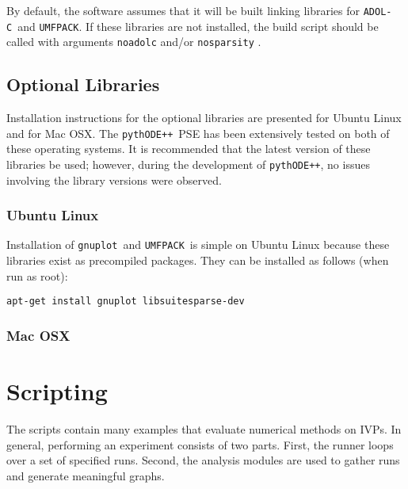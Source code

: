 \documentclass[11pt]{article}
\newcommand{\pypp}{\texttt{pythODE++}}
\newcommand{\adolc}{\texttt{ADOL-C}}
\newcommand{\umfpack}{\texttt{UMFPACK}}
\newcommand{\gnuplot}{\texttt{gnuplot}}
\begin{document}
By default, the software assumes that it will be built linking
libraries for \adolc\ and \umfpack. If these libraries are not
installed, the build script should be called with arguments
\verb=noadolc= and/or \verb=nosparsity= .

\subsection{Optional Libraries}

Installation instructions for the optional libraries are presented for Ubuntu Linux and for Mac OSX. The \pypp\ PSE has been extensively tested on both of these operating systems. It is recommended that the latest version of these libraries be used; however, during the development of \pypp, no issues involving the library versions were observed.

\subsubsection{Ubuntu Linux}

Installation of \gnuplot\ and \umfpack\ is simple on Ubuntu Linux because these libraries exist as precompiled packages. They can be installed as follows (when run as root):
\begin{verbatim}
apt-get install gnuplot libsuitesparse-dev
\end{verbatim}

\subsubsection{Mac OSX}

\section{Scripting}

The scripts contain many examples that evaluate numerical methods on
IVPs. In general, performing an experiment consists of two
parts. First, the runner loops over a set of specified runs. Second,
the analysis modules are used to gather runs and generate
meaningful graphs.
\end{document}
